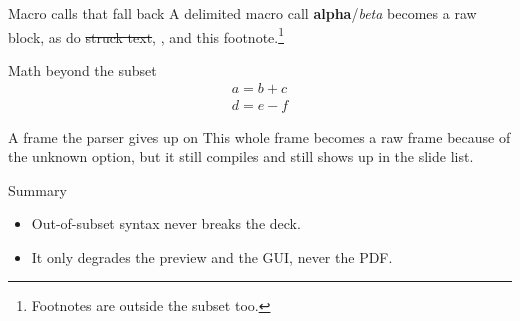 \documentclass[aspectratio=169]{beamer}
\def\emphpair(#1,#2){\textbf{#1}/\textit{#2}}
\begin{document}
\begin{frame}{Macro calls that fall back}
  A delimited macro call \emphpair(alpha,beta) becomes a raw block, as do
  \sout{struck text}, , and this footnote.\footnote{Footnotes are outside the subset too.}
\end{frame}

\begin{frame}{Math beyond the subset}
  \begin{gather*}
    a = b + c \\
    d = e - f
  \end{gather*}
\end{frame}

\begin{frame}[shrink=5]{A frame the parser gives up on}
  This whole frame becomes a raw frame because of the unknown option, but it
  still compiles and still shows up in the slide list.
\end{frame}

\begin{frame}{Summary}
  \begin{itemize}
    \item Out-of-subset syntax never breaks the deck.
    \item It only degrades the preview and the GUI, never the PDF.
  \end{itemize}
\end{frame}
\end{document}
